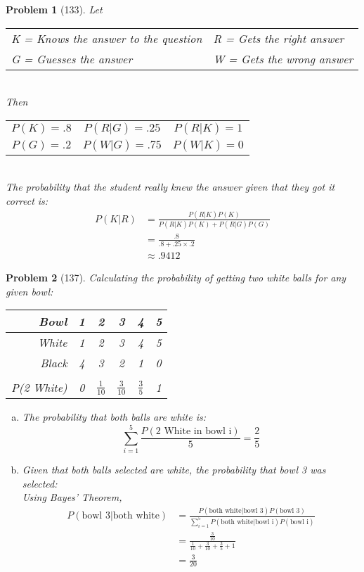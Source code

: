 \documentclass{article}
\theoremstyle{problem}
\newtheorem{prob}{Problem}
\begin{document}
\begin{prob}[133]
Let
\begin{tabular}{l l}
K = Knows the answer to the question & R = Gets the right answer \\ 
G = Guesses the answer               & W = Gets the wrong answer
\end{tabular}\\[.3cm]
Then
\begin{tabular}{c c c}
$P(K) = .8$ & $P(R|G) = .25$ & $P(R|K) = 1$\\
$P(G) = .2$ & $P(W|G) = .75$ & $P(W|K) = 0$
\end{tabular}\\[.3cm]
The probability that the student really knew the answer given that they got it correct is:
\begin{align*}
P(K|R) &= \frac{P(R|K)P(K)}{P(R|K)P(K) + P(R|G)P(G)}\\
       &= \frac{.8}{.8 + .25 \times .2}\\
       &\approx .9412
\end{align*}
\end{prob}

\begin{prob}[137]
Calculating the probability of getting two white balls for any given bowl:\\[.2cm]
\begin{tabular}{r|c c c c c}
Bowl  & 1 & 2 & 3 & 4 & 5 \\
\hline
White & 1 & 2 & 3 & 4 & 5 \\
Black & 4 & 3 & 2 & 1 & 0 \\
\hline\\[-.2cm]
P(2 White) & 0 & $\frac{1}{10}$ & $\frac{3}{10}$ & $\frac{3}{5}$ & 1 \\
\end{tabular}
\begin{enumerate}[a)]
\item The probability that both balls are white is:
$$
\displaystyle \sum_{i=1}^5 \frac{P(\text{2 White in bowl i})}{5} = \frac{2}{5}
$$
\item Given that both balls selected are white, the probability that bowl 3 was selected:\\
Using Bayes' Theorem,
\begin{align*}
P(\text{bowl 3}|\text{both white}) &= 
\frac{P(\text{both white}|\text{bowl 3}) P(\text{bowl 3})}%
{\displaystyle \sum_{i=1}^5 P(\text{both white}|\text{bowl i}) P(\text{bowl i})}\\
&= \frac{\frac{3}{10}}{\frac{1}{10}+\frac{3}{10}+\frac{3}{5}+1}\\
&= \frac{3}{20}
\end{align*}

\end{enumerate}
\end{prob}
\end{document}
